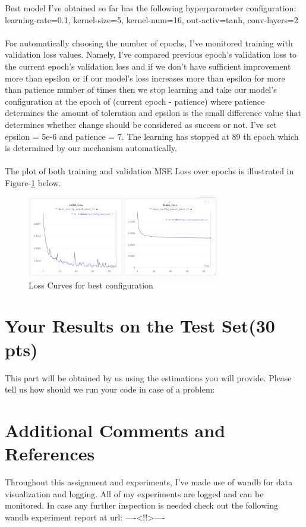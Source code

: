 \documentclass[12pt]{article}
\begin{document}
    \begin{center}
        \raggedright
        Best model I've obtained so far has the following hyperparameter configuration:
        \\
        learning-rate=0.1, kernel-size=5, kernel-num=16, out-activ=tanh, conv-layers=2
        \\~\\
        For automatically choosing the number of epochs, I've monitored training with validation loss values. Namely,
        I've compared previous epoch's validation loss to the current epoch's validation loss and
        if we don't have sufficient improvement more than epsilon or if our model's loss increases more than epsilon
        for more than patience number of times then we stop learning and take our model's configuration at the epoch of (current epoch - patience) where
        patience determines the amount of toleration and epsilon is the small difference value that determines whether change should be considered as success or not.
        I've set epsilon = 5e-6  and patience = 7. The learning has stopped at 89 th epoch which is determined by our mechanism automatically.
        \\~\\
        The plot of both training and validation MSE Loss over epochs is illustrated in Figure-\ref*{fig:part-3_best_config_loss} below.

    \end{center}

    \begin{figure}[!htb]
        \centering
        \includegraphics[width=0.75\textwidth]{figures/best_config_loss.png}
        \caption{Loss Curves for best configuration}
        \label{fig:part-3_best_config_loss}
    \end{figure}
    
\section{Your Results on the Test Set(30 pts)}
This part will be obtained by us using the estimations you will provide. Please tell us how should we run your code in case of a problem:

\section{Additional Comments and References}

Throughout this assignment and experiments, I've made use of wandb for data visualization and logging.
All of my experiments are logged and can be monitored. In case any further inspection is needed check out the following wandb experiment report at url:
----<!!>----
\end{document}
